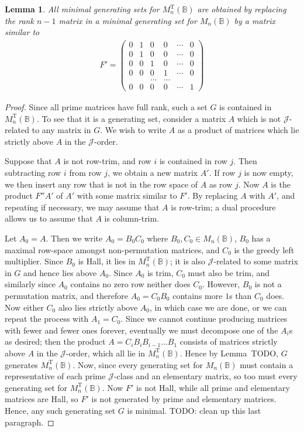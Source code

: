 \documentclass[11pt]{article}
\newtheorem{lemma}[thm]{Lemma}
\numberwithin{equation}{section}
\newcommand{\B}{\mathbb{B}}
\newcommand{\Bn}{M_n(\B)}
\newcommand{\MTn}{M_n^{\text{T}}(\B)}
\newcommand{\J}{\mathscr{J}}
\begin{document}
\begin{lemma}
  All minimal generating sets for $\MTn$ are obtained by replacing the rank $n -
  1$ matrix in a minimal generating set for $\Bn$ by a matrix similar to
  \begin{align*}
    F' = \begin{pmatrix}
      0 & 1 & 0 & 0 & \cdots & 0 \\
      0 & 1 & 0 & 0 & \cdots & 0 \\
      0 & 0 & 1 & 0 & \cdots & 0 \\
      0 & 0 & 0 & 1 & \cdots & 0 \\
        &   &   \dots & \dots & \\
      0 & 0 & 0 & 0 & \cdots & 1
    \end{pmatrix}
  \end{align*}
\end{lemma}
\begin{proof}
  Since all prime matrices have full rank, such a set $G$ is contained in
  $\MTn$. To see that it is a generating set, consider a matrix $A$ which is not
  $\J$-related to any matrix in $G$. We wish to write $A$ as a product of
  matrices which lie strictly above $A$ in the $\J$-order. 
  
  Suppose that $A$ is not row-trim, and row $i$ is contained in row $j$. Then
  subtracting row $i$ from row $j$, we obtain a new matrix $A'$. If row $j$ is
  now empty, we then insert any row that is not in the row space of $A$ as row
  $j$. Now $A$ is the product $F''A'$ of $A'$ with some matrix similar to $F'$. By
  replacing $A$ with $A'$, and repeating if necessary, we may assume that $A$ is
  row-trim; a dual procedure allows us to assume that $A$ is column-trim. 
  
  Let $A_0 = A$. Then we write $A_0 = B_0C_0$ where $B_0, C_0 \in \Bn$, $B_0$ has a
  maximal row-space amongst non-permutation matrices, and $C_0$ is the greedy left
  multiplier. Since $B_0$ is Hall, it lies in $\MTn$; it is also $\J$-related to
  some matrix in $G$ and hence lies above $A_0$. Since $A_0$ is trim, $C_0$ must also
  be trim, and similarly since $A_0$ contains no zero row neither does $C_0$.
  However, $B_0$ is not a permutation matrix, and therefore $A_0 = C_0B_0$ contains more
  $1$s than $C_0$ does. Now either $C_0$ also lies strictly above $A_0$, in which case
  we are done, or we can repeat the process with $A_1 = C_0$. Since we
  cannot continue producing matrices with fewer and fewer ones forever,
  eventually we must decompose one of the $A_i$s as desired; then the product $A
  = C_i B_i B_{i - 1} \ldots B_1$ consists of matrices strictly above $A$ in the
  $\J$-order, which all lie in $\MTn$. Hence by Lemma~TODO, $G$ generates
  $\MTn$.
  Now, since every generating set for $\Bn$ must contain a representative of
  each prime $\J$-class and an elementary matrix, so too must every generating
  set for $\MTn$. Now $F'$ is not Hall, while all prime and elementary matrices
  are Hall, so $F'$ is not generated by prime and elementary matrices. Hence,
  any such generating set $G$ is minimal. TODO: clean up this last paragraph.
\end{proof}
\end{document}
